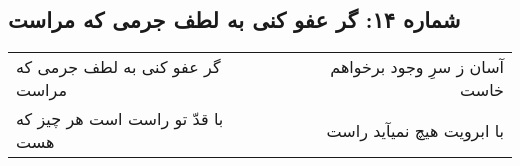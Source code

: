 \begin{center}
\section*{شماره ۱۴: گر عفو کنی به لطف جرمی که مراست}
\label{sec:014}
\begin{longtable}{l p{0.5cm} r}
گر عفو کنی به لطف جرمی که مراست
&&
آسان ز سرِ وجود برخواهم خاست
\\
با قدّ تو راست است هر چیز که هست
&&
با ابرویت هیچ نمیآید راست
\\
\end{longtable}
\end{center}
